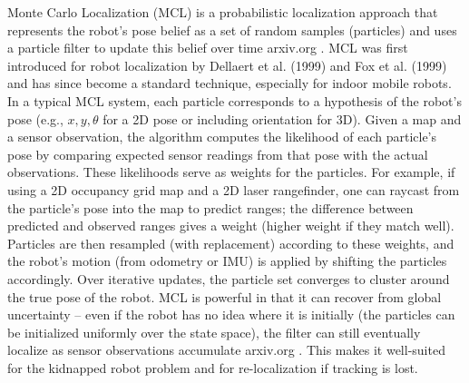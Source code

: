 Monte Carlo Localization (MCL) is a probabilistic localization approach that represents the robot’s pose belief as a set of random samples (particles) and uses a particle filter to update this belief over time​
arxiv.org
. MCL was first introduced for robot localization by Dellaert et al. (1999) and Fox et al. (1999) and has since become a standard technique, especially for indoor mobile robots. In a typical MCL system, each particle corresponds to a hypothesis of the robot’s pose (e.g., $x, y, \theta$ for a 2D pose or including orientation for 3D). Given a map and a sensor observation, the algorithm computes the likelihood of each particle’s pose by comparing expected sensor readings from that pose with the actual observations. These likelihoods serve as weights for the particles. For example, if using a 2D occupancy grid map and a 2D laser rangefinder, one can raycast from the particle’s pose into the map to predict ranges; the difference between predicted and observed ranges gives a weight (higher weight if they match well). Particles are then resampled (with replacement) according to these weights, and the robot’s motion (from odometry or IMU) is applied by shifting the particles accordingly. Over iterative updates, the particle set converges to cluster around the true pose of the robot. MCL is powerful in that it can recover from global uncertainty – even if the robot has no idea where it is initially (the particles can be initialized uniformly over the state space), the filter can still eventually localize as sensor observations accumulate​
arxiv.org
. This makes it well-suited for the kidnapped robot problem and for re-localization if tracking is lost.

